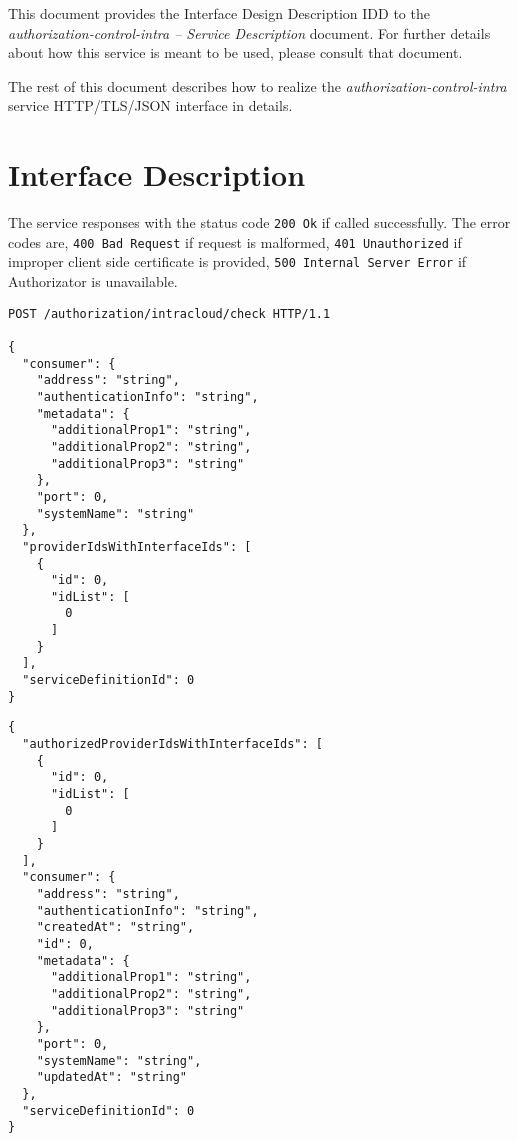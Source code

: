 \documentclass[a4paper]{arrowhead}
\newcommand{\fref}[1]{{\textcolor{ArrowheadBlue}{\hyperref[sec:functions:#1]{#1}}}}
\begin{document}
This document provides the Interface Design Description IDD to the \textit{authorization-control-intra -- Service Description} document.
For further details about how this service is meant to be used, please consult that document.

The rest of this document describes how to realize the \textit{authorization-control-intra} service HTTP/TLS/JSON interface in details.

\newpage

\section{Interface Description}
\label{sec:functions}

The service responses with the status code \texttt{200 Ok} if called successfully. The error codes are, \texttt{400 Bad Request} if request is malformed, \texttt{401 Unauthorized} if improper client side certificate is provided, \texttt{500 Internal Server Error} if Authorizator is unavailable.

\begin{lstlisting}[language=http,label={lst:authorization},caption={An \fref{authorization-control-intra} invocation.}]
POST /authorization/intracloud/check HTTP/1.1

{
  "consumer": {
    "address": "string",
    "authenticationInfo": "string",
    "metadata": {
      "additionalProp1": "string",
      "additionalProp2": "string",
      "additionalProp3": "string"
    },
    "port": 0,
    "systemName": "string"
  },
  "providerIdsWithInterfaceIds": [
    {
      "id": 0,
      "idList": [
        0
      ]
    }
  ],
  "serviceDefinitionId": 0
}

\end{lstlisting}

\clearpage

\begin{lstlisting}[language=http,label={lst:authorization},caption={An \fref{authorization-control-intra} response.}]
{
  "authorizedProviderIdsWithInterfaceIds": [
    {
      "id": 0,
      "idList": [
        0
      ]
    }
  ],
  "consumer": {
    "address": "string",
    "authenticationInfo": "string",
    "createdAt": "string",
    "id": 0,
    "metadata": {
      "additionalProp1": "string",
      "additionalProp2": "string",
      "additionalProp3": "string"
    },
    "port": 0,
    "systemName": "string",
    "updatedAt": "string"
  },
  "serviceDefinitionId": 0
}
\end{lstlisting}
\end{document}
